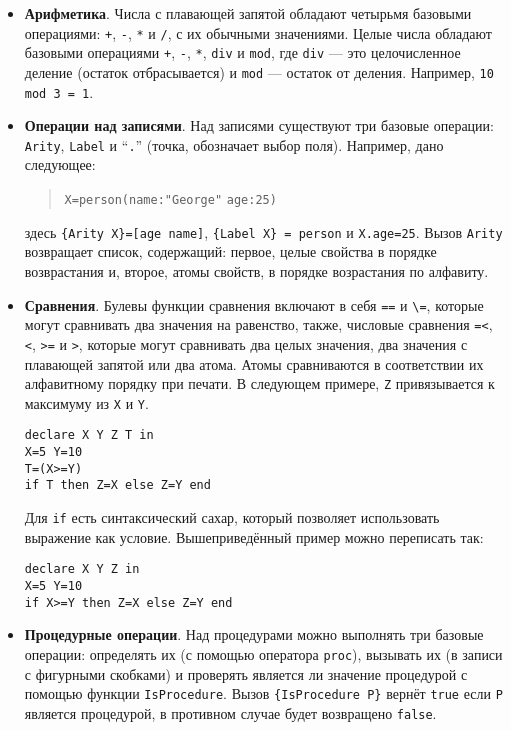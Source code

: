 \begin{itemize}

\item{\textbf{Арифметика}. Числа с плавающей запятой обладают четырьмя базовыми операциями: \lstinline|+|, \lstinline|-|, \lstinline|*| и \lstinline|/|, с их обычными значениями. Целые числа обладают базовыми операциями \lstinline|+|, \lstinline|-|, \lstinline|*|, \lstinline|div| и \lstinline|mod|, где \lstinline|div| --- это целочисленное деление (остаток отбрасывается) и \lstinline|mod| --- остаток от деления. Например, \lstinline|10 mod 3 = 1|.}

\item{\textbf{Операции над записями}. Над записями существуют три базовые операции: \lstinline|Arity|, \lstinline|Label| и ``\lstinline|.|'' (точка, обозначает выбор поля). Например, дано следующее:

  \begin{quote}
\lstinline|X=person(name:"George"| \lstinline|age:25)|
  \end{quote}
  
здесь \lstinline|{Arity X}=[age name]|, \lstinline|{Label X} = person| и \lstinline|X.age=25|. Вызов \lstinline|Arity| возвращает список, содержащий: первое, целые свойства в порядке возврастания и, второе, атомы свойств, в порядке возрастания по алфавиту.}

\item{\textbf{Сравнения}. Булевы функции сравнения включают в себя \lstinline|==| и \lstinline|\=|, которые могут сравнивать два значения на равенство, также, числовые сравнения \lstinline|=<|, \lstinline|<|, \lstinline|>=| и \lstinline|>|, которые могут сравнивать два целых значения, два значения с плавающей запятой или два атома. Атомы сравниваются в соответствии их алфавитному порядку при печати. В следующем примере, \lstinline|Z| привязывается к максимуму из \lstinline|X| и \lstinline|Y|.

  \begin{lstlisting}
declare X Y Z T in
X=5 Y=10
T=(X>=Y)
if T then Z=X else Z=Y end
  \end{lstlisting}
  
Для \lstinline|if| есть синтаксический сахар, который позволяет использовать выражение как условие. Вышеприведённый пример можно переписать так:

\begin{lstlisting}
declare X Y Z in
X=5 Y=10
if X>=Y then Z=X else Z=Y end
\end{lstlisting}
}
  
\item{\textbf{Процедурные операции}. Над процедурами можно выполнять три базовые операции: определять их (с помощью оператора \lstinline|proc|), вызывать их (в записи с фигурными скобками) и проверять является ли значение процедурой с помощью функции \lstinline|IsProcedure|. Вызов \lstinline|{IsProcedure P}| вернёт \lstinline|true| если \lstinline|P| является процедурой, в противном случае будет возвращено \lstinline|false|.}
\end{itemize}


